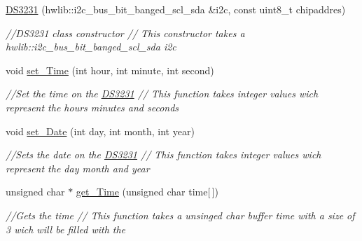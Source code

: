 \begin{DoxyCompactItemize}
\item 
\mbox{\label{classDS3231_ae604eb753bffe5a7752c0c6131c199c0}} 
\hyperlink{classDS3231_ae604eb753bffe5a7752c0c6131c199c0}{D\+S3231} (hwlib\+::i2c\+\_\+bus\+\_\+bit\+\_\+banged\+\_\+scl\+\_\+sda \&i2c, const uint8\+\_\+t chipaddres)
\begin{DoxyCompactList}\small\item\em //\+D\+S3231 class constructor  // This constructor takes a hwlib\+::i2c\+\_\+bus\+\_\+bit\+\_\+banged\+\_\+scl\+\_\+sda i2c \end{DoxyCompactList}\item 
\mbox{\label{classDS3231_aee414e3f1856b9495a79e659b92231c1}} 
void \hyperlink{classDS3231_aee414e3f1856b9495a79e659b92231c1}{set\+\_\+\+Time} (int hour, int minute, int second)
\begin{DoxyCompactList}\small\item\em //\+Set the time on the \hyperlink{classDS3231}{D\+S3231}  // This function takes integer values wich represent the hours minutes and seconds \end{DoxyCompactList}\item 
\mbox{\label{classDS3231_a9c7b9495c68607c0666006f318e9afca}} 
void \hyperlink{classDS3231_a9c7b9495c68607c0666006f318e9afca}{set\+\_\+\+Date} (int day, int month, int year)
\begin{DoxyCompactList}\small\item\em //\+Sets the date on the \hyperlink{classDS3231}{D\+S3231}  // This function takes integer values wich represent the day month and year \end{DoxyCompactList}\item 
\mbox{\label{classDS3231_a2fd39852689c72e04cc2ad67371976c1}} 
unsigned char $\ast$ \hyperlink{classDS3231_a2fd39852689c72e04cc2ad67371976c1}{get\+\_\+\+Time} (unsigned char time\mbox{[}$\,$\mbox{]})
\begin{DoxyCompactList}\small\item\em //\+Gets the time  // This function takes a unsinged char buffer time with a size of 3 wich will be filled with the \end{DoxyCompactList}\item 
\mbox{\label{classDS3231_a3f239b6d1a7caea0d5968e96d4d01c33}} 

\end{DoxyCompactItemize}
